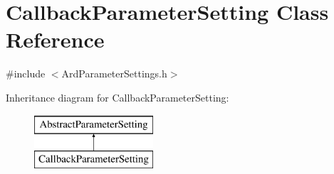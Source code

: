 \hypertarget{class_callback_parameter_setting}{\section{Callback\-Parameter\-Setting Class Reference}
\label{class_callback_parameter_setting}
}


{\ttfamily \#include $<$Ard\-Parameter\-Settings.\-h$>$}

Inheritance diagram for Callback\-Parameter\-Setting\-:\begin{figure}[H]
\begin{center}
\leavevmode
\includegraphics[height=2.000000cm]{class_callback_parameter_setting}
\end{center}
\end{figure}

